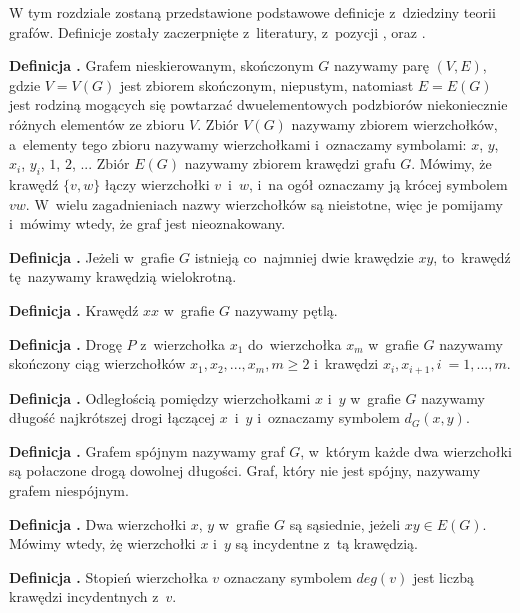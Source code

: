 W tym rozdziale zostaną przedstawione podstawowe definicje z~dziedziny teorii grafów.
Definicje zostały zaczerpnięte z~literatury, z~pozycji \cite{Wloch2008}, \cite{Wilson2012} oraz \cite{Wojciechwoski2013}.

\noindent
\textbf{Definicja .}
\incrementdefinitionIndex
Grafem nieskierowanym, skończonym $G$ nazywamy parę $(V,E)$, gdzie $V = V(G)$ jest zbiorem skończonym, niepustym,
natomiast $E = E(G)$ jest rodziną mogących się powtarzać dwuelementowych podzbiorów niekoniecznie różnych elementów ze zbioru $V$.
Zbiór $V(G)$ nazywamy zbiorem wierzchołków, a~elementy tego zbioru nazywamy wierzchołkami i~oznaczamy symbolami:
$x$, $y$, $x_i$, $y_i$, $1$, $2$, ... Zbiór $E(G)$ nazywamy zbiorem krawędzi grafu $G$.
Mówimy, że krawędź $\{v, w\}$ łączy wierzchołki $v$~i~$w$, i~na ogół oznaczamy ją krócej symbolem $vw$.
W~wielu zagadnieniach nazwy wierzchołków są nieistotne, więc je pomijamy i~mówimy wtedy, że graf jest nieoznakowany.

\noindent
\textbf{Definicja .}
\incrementdefinitionIndex
Jeżeli w~grafie $G$ istnieją co~najmniej dwie krawędzie $xy$, to~krawędź tę~nazywamy krawędzią wielokrotną.

\noindent
\textbf{Definicja .}
\incrementdefinitionIndex
Krawędź $xx$ w~grafie $G$ nazywamy pętlą.

\noindent
\textbf{Definicja .}
\incrementdefinitionIndex
Drogę $P$ z~wierzchołka $x_1$ do~wierzchołka $x_m$ w~grafie $G$ nazywamy skończony ciąg wierzchołków
$x_1, x_2, ..., x_m, m \geqslant 2$ i~krawędzi ${x_i, x_{i + 1}}, i~= 1, ..., m$.

\noindent
\textbf{Definicja .}
\incrementdefinitionIndex
Odległością pomiędzy wierzchołkami $x$ i~$y$ w~grafie $G$ nazywamy długość najkrótszej drogi łączącej $x$~i~$y$
i~oznaczamy symbolem $d_G(x,y)$.

\noindent
\textbf{Definicja .}
\incrementdefinitionIndex
Grafem spójnym nazywamy graf $G$, w~którym każde dwa wierzchołki są połaczone drogą dowolnej długości.
Graf, który nie jest spójny, nazywamy grafem niespójnym.

\noindent
\textbf{Definicja .}
\incrementdefinitionIndex
Dwa wierzchołki $x$, $y$ w~grafie $G$ są sąsiednie, jeżeli $xy \in E(G)$.
Mówimy wtedy, żę wierzchołki $x$ i~$y$ są incydentne z~tą krawędzią.

\noindent
\textbf{Definicja .}
\incrementdefinitionIndex
Stopień wierzchołka $v$ oznaczany symbolem $deg(v)$ jest liczbą krawędzi incydentnych z~$v$.

